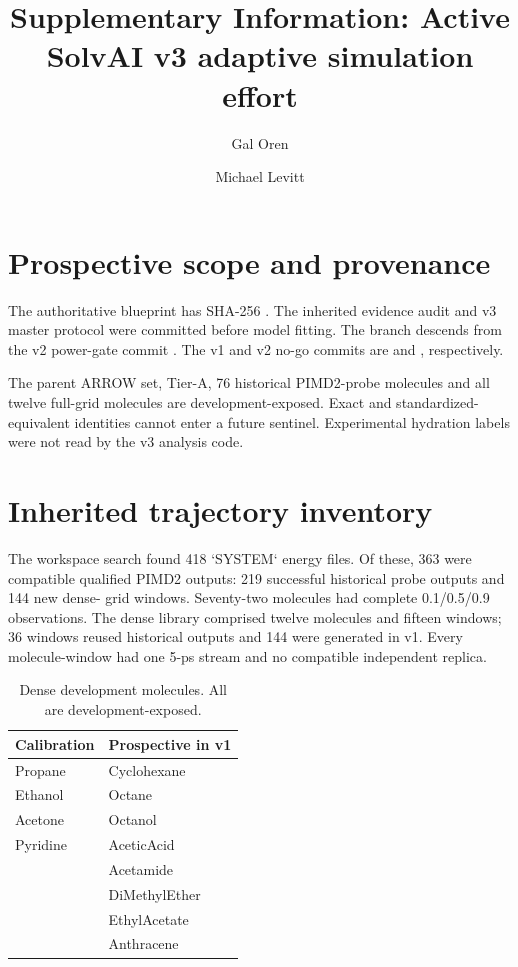\documentclass[11pt]{article}
\title{Supplementary Information: Active SolvAI v3 adaptive simulation effort}
\author{Gal Oren \and Michael Levitt}
\date{}
\begin{document}
\maketitle

\section{Prospective scope and provenance}

The authoritative blueprint has SHA-256
.
The inherited evidence audit and v3 master protocol were committed before model
fitting. The branch descends from the v2 power-gate commit
. The v1 and v2 no-go commits are
 and
, respectively.

The parent ARROW set, Tier-A, 76 historical PIMD2-probe molecules and all twelve
full-grid molecules are development-exposed. Exact and standardized-equivalent
identities cannot enter a future sentinel. Experimental hydration labels were not
read by the v3 analysis code.

\section{Inherited trajectory inventory}

The workspace search found 418 `SYSTEM` energy files. Of these, 363 were compatible
qualified PIMD2 outputs: 219 successful historical probe outputs and 144 new dense-
grid windows. Seventy-two molecules had complete 0.1/0.5/0.9 observations. The dense
library comprised twelve molecules and fifteen windows; 36 windows reused historical
outputs and 144 were generated in v1. Every molecule-window had one 5-ps stream and no
compatible independent replica.

\begin{table}[ht]
\centering
\caption{Dense development molecules. All are development-exposed.}
\begin{tabular}{ll}
\toprule
Calibration & Prospective in v1 \\
\midrule
Propane & Cyclohexane \\
Ethanol & Octane \\
Acetone & Octanol \\
Pyridine & AceticAcid \\
 & Acetamide \\
 & DiMethylEther \\
 & EthylAcetate \\
 & Anthracene \\
\bottomrule
\end{tabular}
\end{table}
\end{document}
